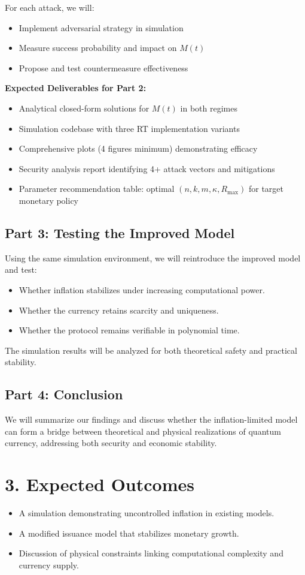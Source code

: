\documentclass[a4paper,10.5pt,twoside]{article}
\begin{document}
For each attack, we will:
\begin{itemize}
    \item Implement adversarial strategy in simulation
    \item Measure success probability and impact on $M(t)$
    \item Propose and test countermeasure effectiveness
\end{itemize}

\textbf{Expected Deliverables for Part 2:}
\begin{itemize}
    \item Analytical closed-form solutions for $M(t)$ in both regimes
    \item Simulation codebase with three RT implementation variants
    \item Comprehensive plots (4 figures minimum) demonstrating efficacy
    \item Security analysis report identifying 4+ attack vectors and mitigations
    \item Parameter recommendation table: optimal $(n, k, m, \kappa, R_{\max})$ for target monetary policy
\end{itemize}
\subsection*{Part 3: Testing the Improved Model}
Using the same simulation environment, we will reintroduce the improved model and test:
\begin{itemize}
    \item Whether inflation stabilizes under increasing computational power.
    \item Whether the currency retains scarcity and uniqueness.
    \item Whether the protocol remains verifiable in polynomial time.
\end{itemize}
The simulation results will be analyzed for both theoretical safety and practical stability.

\subsection*{Part 4: Conclusion}
We will summarize our findings and discuss whether the inflation-limited model can form a bridge between theoretical and physical realizations of quantum currency, addressing both security and economic stability.

\section*{3. Expected Outcomes}
\begin{itemize}
    \item A simulation demonstrating uncontrolled inflation in existing models.
    \item A modified issuance model that stabilizes monetary growth.
    \item Discussion of physical constraints linking computational complexity and currency supply.
\end{itemize}
\end{document}

